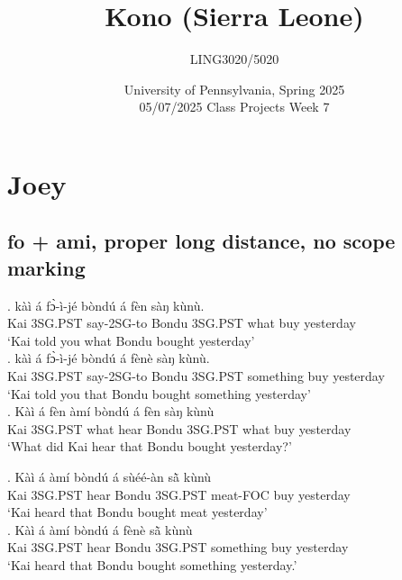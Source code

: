 \documentclass{assets/fieldnotes}
\title{Kono (Sierra Leone)}
\author{LING3020/5020}
\date{University of Pennsylvania, Spring 2025\\05/07/2025 Class Projects Week 7}
\begin{document}
\maketitle

\maketitle
\tableofcontents


\section{Joey}

\subsection{fo + ami, proper long distance, no scope marking}

\exg. kàì á fɔ̀-ì-jé bòndú á fèn sàŋ kùnù.\\
Kai 3SG.PST say-2SG-to Bondu 3SG.PST what buy yesterday\\
`Kai told you what Bondu bought yesterday'  \\

\exg. kàì á fɔ̀-ì-jé bòndú á fènè sàŋ kùnù.\\
Kai 3SG.PST say-2SG-to Bondu 3SG.PST something buy yesterday\\
`Kai told you that Bondu bought something yesterday'  \\

\exg.  Kàì á fèn àmí bòndú á fèn sàŋ kùnù\\
Kai 3SG.PST what hear Bondu 3SG.PST what buy yesterday\\
`What did Kai hear that Bondu bought yesterday?' \\


\exg. Kàì á àmí bòndú á sùéé-àn sã̀  kùnù\\
Kai 3SG.PST hear Bondu 3SG.PST meat-FOC buy yesterday\\
`Kai heard that Bondu bought meat yesterday'  \\

\exg.  Kàì á àmí bòndú á fènè sã̀  kùnù\\
Kai 3SG.PST hear Bondu 3SG.PST something buy yesterday\\
`Kai heard that Bondu bought something yesterday.' \\
\end{document}
